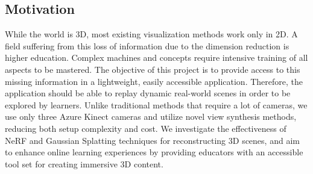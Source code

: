 \documentclass[conference]{IEEEtran}
\begin{document}
\subsection{Motivation}
While the world is 3D, most existing visualization methods work only in 2D. A field suffering from this loss of information due to the dimension reduction is
higher education. Complex machines and concepts require intensive training of all aspects to be mastered. The objective of this project is to provide access to this missing information in a lightweight, easily accessible application. Therefore, the application should be able to replay dynamic real-world scenes in order to be explored by learners. Unlike traditional methods that require a lot of cameras, we use only three Azure Kinect cameras and utilize novel view synthesis methods, reducing both setup complexity and cost. We investigate the effectiveness of NeRF and Gaussian Splatting techniques for reconstructing 3D
scenes, and aim to enhance online learning experiences by providing educators with an accessible tool set for creating immersive 3D content.
\end{document}
